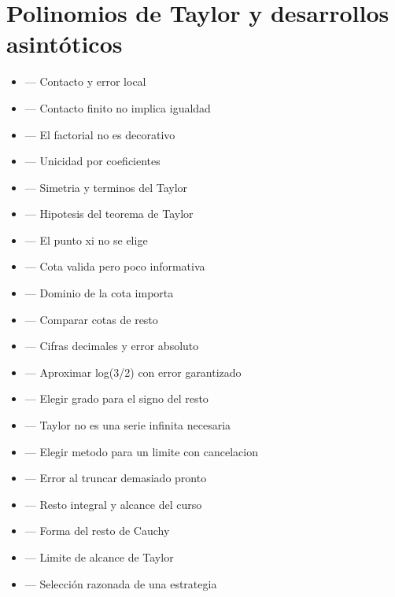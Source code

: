 \documentclass[10pt,a4paper,oneside,openany]{book}
\begin{document}
\section*{Polinomios de Taylor y desarrollos asintóticos}
\begin{itemize}
\item {} — Contacto y error local
\item {} — Contacto finito no implica igualdad
\item {} — El factorial no es decorativo
\item {} — Unicidad por coeficientes
\item {} — Simetria y terminos del Taylor
\item {} — Hipotesis del teorema de Taylor
\item {} — El punto xi no se elige
\item {} — Cota valida pero poco informativa
\item {} — Dominio de la cota importa
\item {} — Comparar cotas de resto
\item {} — Cifras decimales y error absoluto
\item {} — Aproximar log(3/2) con error garantizado
\item {} — Elegir grado para el signo del resto
\item {} — Taylor no es una serie infinita necesaria
\item {} — Elegir metodo para un limite con cancelacion
\item {} — Error al truncar demasiado pronto
\item {} — Resto integral y alcance del curso
\item {} — Forma del resto de Cauchy
\item {} — Limite de alcance de Taylor
\item {} — Selección razonada de una estrategia
\end{itemize}
\end{document}
